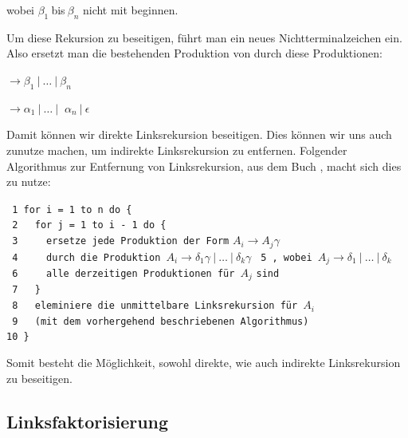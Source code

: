 \noindent wobei $\beta_1\ $bis$\ \beta_n$ nicht mit 
beginnen.\vspace{10pt}

\noindent Um diese Rekursion zu beseitigen, führt man ein neues
Nichtterminalzeichen  ein. Also ersetzt man die
bestehenden Produktion von
 durch diese Produktionen:\vspace{10pt}

 $\to \beta_1\ |\ \ldots\ |\ \beta_n$

 $\to \alpha_1$$\ |\ \ldots\ |\
$ $\alpha_n$$\ |\ \epsilon$\vspace{10pt}

\noindent Damit können wir direkte Linksrekursion beseitigen. Dies können wir
uns auch zunutze machen, um indirekte Linksrekursion zu entfernen. Folgender
Algorithmus zur Entfernung von Linksrekursion, aus dem Buch \cite{Compilers},
macht sich dies zu nutze:\vspace{10pt}

\noindent
\verb| 1 for i = 1 to n do {|\\
\verb| 2   for j = 1 to i - 1 do {|\\
\verb| 3     ersetze jede Produktion der Form| $A_i \to A_j \gamma$ \verb| |\\ 
\verb| 4     durch die Produktion |$A_i \to \delta_1\gamma\ |\ \ldots\ |\ \delta_k\gamma$
\verb| 5 , wobei |$A_j \to \delta_1\ |\ \ldots\ |\ \delta_k$\\ 
\verb| 6     alle derzeitigen Produktionen für |$A_j$ \verb|sind|\\ 
\verb| 7   }|\\
\verb| 8   eleminiere die unmittelbare Linksrekursion für |$A_i$\\
\verb| 9   (mit dem vorhergehend beschriebenen Algorithmus)|\\
\verb|10 }|
\vspace{10pt}

Somit besteht die Möglichkeit, sowohl direkte, wie auch indirekte Linksrekursion
zu beseitigen.\vspace{10pt}


\subsection{Linksfaktorisierung}\label{PerspectiveLeftfactorisation}

